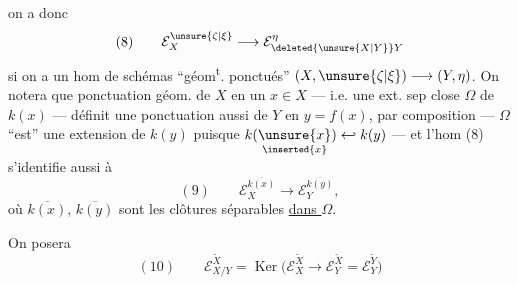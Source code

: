 
on a donc
\[
(8)\qquad \mathcal E_X^{\unsure{\zeta|\xi}}\longrightarrow\mathcal E_{\deleted{\unsure{X|Y}}Y}^\eta
\]
si on a un hom de schémas ``géom\textsuperscript{t}.
ponctués'' $(X,\unsure{\zeta|\xi})\longrightarrow(Y,\eta)$. On
notera que  ponctuation géom.
de $X$ en un $x\in X$ --- i.e. une
ext. sep close $\Omega$ de $k(x)$ ---
définit  une ponctuation  aussi 
de $Y$ en $y=f(x)$,  par composition
--- $\Omega$ ``est'' une extension de $k(y)$ puisque
$k(\underset{\inserted{x}}{\unsure{x}})\hookleftarrow k(y)$ --- et l'hom (8)
s'identifie aussi à
\[
(9)\qquad \mathcal E_X^{\overline{k(x)}}\longrightarrow\mathcal E_Y^{\overline{k(y)}},
\]
où $\overline{k(x)}$, $\overline{k(y)}$ sont les clôtures séparables
\uline{dans $\Omega$}.

On posera
\[
(10)\qquad \mathcal E_{X/Y}^{\widetilde X}=\operatorname{Ker}\bigl(\mathcal E_X^{\widetilde X}\longrightarrow\mathcal E_Y^{\widetilde X}=\mathcal E_Y^{\widetilde Y}\bigr)
\]

